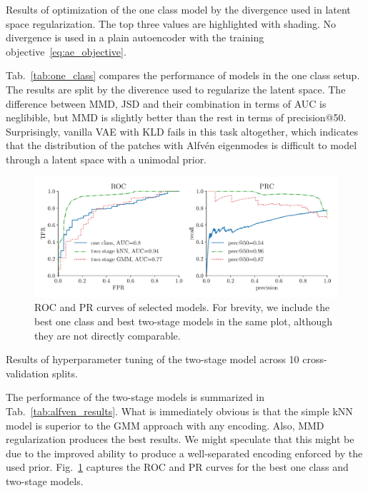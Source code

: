\begin{table}
  \centering
  
  \caption{Results of optimization of the one class model by the divergence used in latent space regularization. The top three values are highlighted with shading. No divergence is used in a plain autoencoder with the training objective~\eqref{eq:ae_objective}.}
  \label{tab:one_class}
\end{table}

Tab.~\ref{tab:one_class} compares the performance of models in the one class setup. The results are split by the diverence used to regularize the latent space. The difference between MMD, JSD and their combination in terms of AUC is neglibible, but MMD is slightly better than the rest in terms of precision@50. Surprisingly, vanilla VAE with KLD fails in this task altogether, which indicates that the distribution of the patches with Alfvén eigenmodes is difficult to model through a latent space with a unimodal prior.

\begin{figure}
\begin{centering}
\includegraphics[scale=0.6]{data/chapter_alfven/roc_prc.pdf}
\end{centering}
\caption{ROC and PR curves of selected models. For brevity, we include the best one class and best two-stage models in the same plot, although they are not directly comparable.}
\label{fig:roc_prc}
\end{figure}

\begin{table}
\centering

\caption{Results of hyperparameter tuning of the two-stage model across 10 cross-validation splits.}
\label{tab:alfven_results}
\end{table}

The performance of the two-stage models is summarized in Tab.~\ref{tab:alfven_results}. What is immediately obvious is that the simple kNN model is superior to the GMM approach with any encoding. Also, MMD regularization produces the best results. We might speculate that this might be due to the improved ability to produce a well-separated encoding enforced by the used prior. Fig.~\ref{fig:roc_prc} captures the ROC and PR curves for the best one class and two-stage models.

